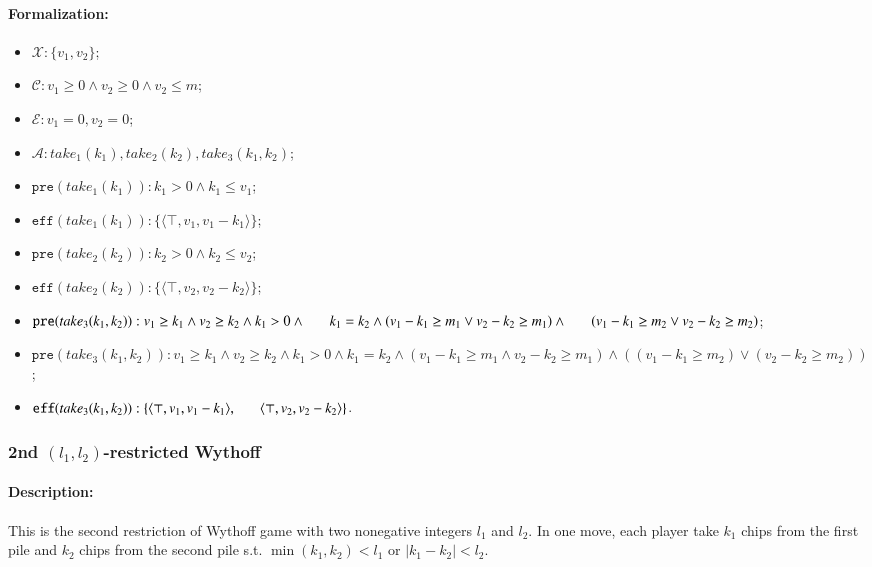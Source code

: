 \documentclass[review]{elsarticle}
\newcommand{\set}[1]{\{ #1 \}}
\newcommand{\tuple}[1]{\langle {#1} \rangle}
\newcommand{\true}{\top}
\newcommand{\statevar}{\mathcal{X}}
\newcommand{\act}{\mathcal{A}}
\newcommand{\constraint}{\mathcal{C}}
\newcommand{\estate}{\mathcal{E}}
\newcommand{\pre}{\mathtt{pre}}
\newcommand{\eff}{\mathtt{eff}}
\begin{document}
\paragraph{Formalization:}
\begin{itemize}
	\item $\statevar: \set{v_1, v_2}$;
	\item $\constraint: v_1 \ge 0 \wedge  v_2 \ge 0 \wedge v_2 \le m$;
	\item $\estate: v_1 =0 , v_2 = 0$;
	\item $\act:take_1(k_1), take_2(k_2), take_3(k_1,k_2)$;
	\item $\pre(take_1(k_1)) :  k_1 > 0 \wedge k_1 \le v_1$;
	\item $\eff(take_1(k_1)) : \set{\tuple{\true, v_1, v_1-k_1}}$;
	\item $\pre(take_2(k_2)) :  k_2 > 0 \wedge k_2 \le v_2$;
	\item $\eff(take_2(k_2)) : \set{\tuple{\true, v_2, v_2-k_2}}$;
	\item $\pre(take_3(k_1, k_2)) : v_1 \ge k_1 \wedge v_2 \ge k_2 \wedge
	k_1 > 0 \wedge  \\ \hspace*{6mm} k_1 = k_2 \wedge (v_1 - k_1 \ge m_1 \vee v_2 - k_2 \ge m_1) \wedge \\ \hspace*{6mm}
	(v_1 - k_1 \ge m_2 \vee v_2 - k_2 \ge m_2)$;
	\item {\color{red}$\pre(take_3(k_1, k_2)) : v_1 \ge k_1 \wedge v_2 \ge k_2 \wedge k_1 > 0 \wedge k_1 = k_2 \wedge (v_1 - k_1 \ge m_1 \wedge v_2 - k_2 \ge m_1) \wedge ((v_1 - k_1 \ge m_2) \vee (v_2 - k_2 \ge m_2))$;}
	\item $\eff(take_3(k_1, k_2)) : \set{\tuple{\true, v_1, v_1 -k_1},\\ \hspace*{6mm}
		\tuple{\true, v_2, v_2 - k_2}}$.
\end{itemize}



\subsubsection{2nd $(l_1,l_2)$-restricted Wythoff \protect\cite{Gur2012}}

\paragraph{Description:}
This is the second restriction of Wythoff game with two nonegative integers $l_1$ and $l_2$.
In one move, each player take $k_1$ chips from the first pile and $k_2$ chips from the second pile s.t. $\min(k_1, k_2) < l_1$ or $|k_1 - k_2| < l_2$.
%
\end{document}
